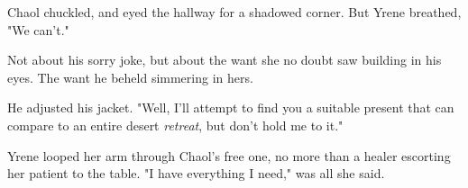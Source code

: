 Chaol chuckled, and eyed the hallway for a shadowed corner.
But Yrene breathed, "We can't."

Not about his sorry joke, but about the want she no doubt saw building in his eyes.
The want he beheld simmering in hers.

He adjusted his jacket.
"Well, I'll attempt to find you a suitable present that can compare to an entire desert \emph{retreat}, but don't hold me to it."

Yrene looped her arm through Chaol's free one, no more than a healer escorting her patient to the table.
"I have everything I need," was all she said.

